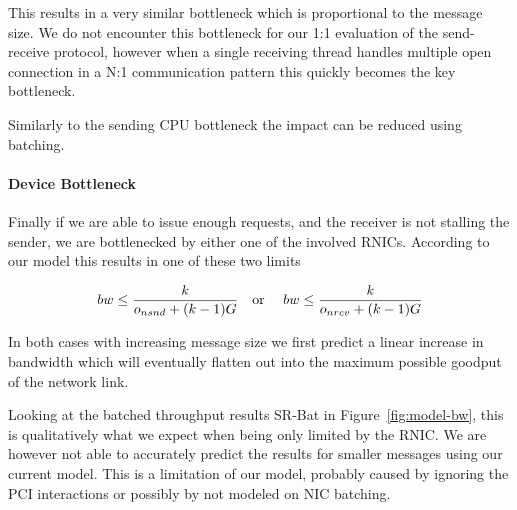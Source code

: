 This results in a very similar bottleneck which is proportional to the message size. We do not encounter this bottleneck for
our 1:1 evaluation of the send-receive protocol, however when a single receiving thread handles multiple open connection 
in a N:1 communication pattern this quickly becomes the key bottleneck.

Similarly to the sending CPU bottleneck the impact can be reduced using batching.


\paragraph{Device Bottleneck} Finally if we are able to issue enough requests, and the receiver is not stalling the sender,
we are bottlenecked by either one of the involved RNICs. According to our model this results in one of these two limits

$$
bw \leq \frac{k}{o_{nsnd} + (k-1)G} \text{\quad or \quad} bw \leq \frac{k}{o_{nrcv} + (k-1)G}
$$

In both cases with increasing message size we first predict a linear increase in bandwidth which will eventually 
flatten out into the maximum possible goodput of the network link.

Looking at the batched throughput results SR-Bat in Figure~\ref{fig:model-bw}, this is qualitatively what we expect 
when being only limited by the RNIC. We are however not able to accurately predict the results for smaller messages 
using our current model. This is a limitation of our model, probably caused by ignoring the PCI interactions or possibly
by not modeled on NIC batching.

